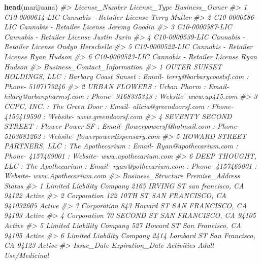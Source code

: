 \documentclass[
  12pt,
]{book}
\newenvironment{Shaded}{\begin{snugshade}}{\end{snugshade}}
\newcommand{\CommentTok}[1]{\textcolor[rgb]{0.56,0.35,0.01}{\textit{#1}}}
\newcommand{\KeywordTok}[1]{\textcolor[rgb]{0.13,0.29,0.53}{\textbf{#1}}}
\newcommand{\NormalTok}[1]{#1}
\begin{document}
\begin{Shaded}
\begin{Highlighting}[]
\KeywordTok{head}\NormalTok{(marijuana)}
\CommentTok{\#>    License\_Number                License\_Type   Business\_Owner}
\CommentTok{\#> 1 C10{-}0000614{-}LIC Cannabis {-} Retailer License     Terry Muller}
\CommentTok{\#> 2 C10{-}0000586{-}LIC Cannabis {-} Retailer License    Jeremy Goodin}
\CommentTok{\#> 3 C10{-}0000587{-}LIC Cannabis {-} Retailer License     Justin Jarin}
\CommentTok{\#> 4 C10{-}0000539{-}LIC Cannabis {-} Retailer License Ondyn Herschelle}
\CommentTok{\#> 5 C10{-}0000522{-}LIC Cannabis {-} Retailer License      Ryan Hudson}
\CommentTok{\#> 6 C10{-}0000523{-}LIC Cannabis {-} Retailer License      Ryan Hudson}
\CommentTok{\#>                                                                                                           Business\_Contact\_Information}
\CommentTok{\#> 1                             OUTER SUNSET HOLDINGS, LLC  : Barbary Coast Sunset : Email{-} terry@barbarycoastsf.com : Phone{-} 5107173246}
\CommentTok{\#> 2                           URBAN FLOWERS  : Urban Pharm : Email{-} hilary@urbanpharmsf.com : Phone{-} 9168335343 : Website{-} www.up415.com}
\CommentTok{\#> 3                      CCPC, INC.  : The Green Door : Email{-} alicia@greendoorsf.com : Phone{-} 4155419590 : Website{-} www.greendoorsf.com}
\CommentTok{\#> 4 SEVENTY SECOND STREET  : Flower Power SF : Email{-} flowerpowersf@hotmail.com : Phone{-} 5103681262 : Website{-} flowerpowerdispensary.com}
\CommentTok{\#> 5   HOWARD STREET PARTNERS, LLC  : The Apothecarium : Email{-} Ryan@apothecarium.com : Phone{-} 4157469001 : Website{-} www.apothecarium.com}
\CommentTok{\#> 6              DEEP THOUGHT, LLC  : The Apothecarium : Email{-} ryan@pothecarium.com : Phone{-} 4157469001 : Website{-} www.Apothecarium.com}
\CommentTok{\#>          Business\_Structure                         Premise\_Address Status}
\CommentTok{\#> 1 Limited Liability Company  2165 IRVING ST san francisco, CA 94122 Active}
\CommentTok{\#> 2               Corporation 122 10TH ST SAN FRANCISCO, CA 941032605 Active}
\CommentTok{\#> 3               Corporation   843 Howard ST SAN FRANCISCO, CA 94103 Active}
\CommentTok{\#> 4               Corporation    70 SECOND ST SAN FRANCISCO, CA 94105 Active}
\CommentTok{\#> 5 Limited Liability Company   527 Howard ST San Francisco, CA 94105 Active}
\CommentTok{\#> 6 Limited Liability Company 2414 Lombard ST San Francisco, CA 94123 Active}
\CommentTok{\#>   Issue\_Date Expiration\_Date                Activities Adult{-}Use/Medicinal}

\end{Highlighting}
\end{Shaded}
\end{document}
